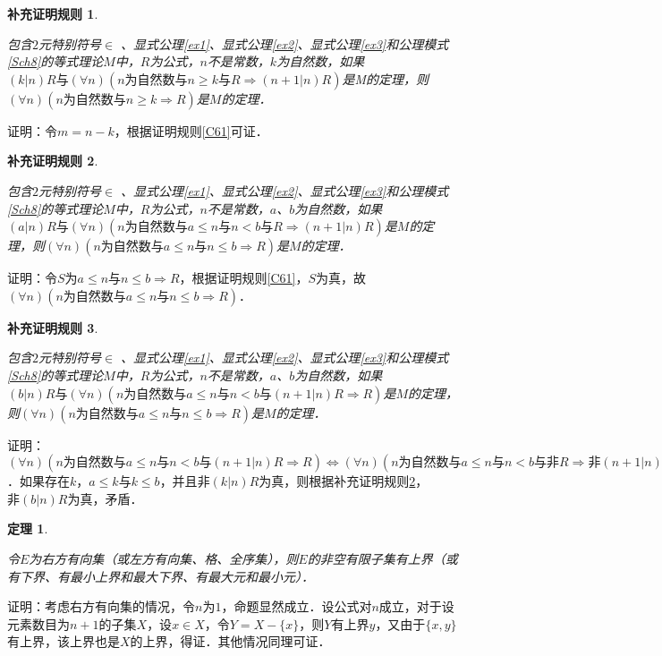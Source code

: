 \documentclass[12pt, a4paper, oneside]{book}
\newtheorem{Ccor}{补充证明规则}
\newtheorem{theo}{定理}
\begin{document}
			\begin{Ccor}\label{Ccor88}
				\hfill\par
				包含$2$元特别符号$\in$ 、显式公理\ref{ex1}、显式公理\ref{ex2}、显式公理\ref{ex3}和公理模式\ref{Sch8}的等式理论$M$中，$R$为公式，$n$不是常数，$k$为自然数，如果$(k|n)R\text{与}(\forall n)(n\text{为自然数}\text{与}n\geq k\text{与}R\Rightarrow (n+1|n)R)$是M的定理，则$(\forall n)(n\text{为自然数}\text{与}n\geq k\Rightarrow R)$是$M$的定理．
			\end{Ccor}
			证明：令$m=n-k$，根据证明规则\ref{C61}可证．
			
			\begin{Ccor}\label{Ccor89}
				\hfill\par
				包含$2$元特别符号$\in$ 、显式公理\ref{ex1}、显式公理\ref{ex2}、显式公理\ref{ex3}和公理模式\ref{Sch8}的等式理论$M$中，$R$为公式，$n$不是常数，$a$、$b$为自然数，如果$(a|n)R\text{与}(\forall n)(n\text{为自然数}\text{与}a\leq n\text{与}n<b\text{与}R \Rightarrow (n+1|n)R)$是$M$的定理，则$(\forall n)(n\text{为自然数}\text{与}a\leq n\text{与}n\leq b \Rightarrow R)$是$M$的定理．
			\end{Ccor}
			证明：令$S$为$a\leq n\text{与}n\leq b \Rightarrow R$，根据证明规则\ref{C61}，$S$为真，故$(\forall n)(n\text{为自然数}\text{与}a\leq n\text{与}n\leq b \Rightarrow R)$．
						
			\begin{Ccor}\label{Ccor90}
				\hfill\par
				包含$2$元特别符号$\in$ 、显式公理\ref{ex1}、显式公理\ref{ex2}、显式公理\ref{ex3}和公理模式\ref{Sch8}的等式理论$M$中，$R$为公式，$n$不是常数，$a$、$b$为自然数，如果$(b|n)R\text{与}(\forall n)(n\text{为自然数}\text{与}a\leq n\text{与}n<b\text{与}(n+1|n)R \Rightarrow R)$是$M$的定理，则$(\forall n)(n\text{为自然数}\text{与}a\leq n\text{与}n\leq b \Rightarrow R)$是$M$的定理．
			\end{Ccor}
			证明：$(\forall n)(n\text{为自然数}\text{与}a\leq n\text{与}n<b\text{与}(n+1|n)R \Rightarrow R)\Leftrightarrow (\forall n)(n\text{为自然数}\text{与}a\leq n\text{与}n<b\text{与}\text{非}R \Rightarrow \text{非}(n+1|n)R)$．如果存在$k$，$a\leq k\text{与}k\leq b$，并且$\text{非}(k|n)R$为真，则根据补充证明规则\ref{Ccor89}，$\text{非}(b|n)R$为真，矛盾．
						
			\begin{theo}\label{theo121}
				\hfill\par
				令$E$为右方有向集（或左方有向集、格、全序集），则$E$的非空有限子集有上界（或有下界、有最小上界和最大下界、有最大元和最小元）．
			\end{theo}
			证明：考虑右方有向集的情况，令$n$为$1$，命题显然成立．设公式对$n$成立，对于设元素数目为$n+1$的子集$X$，设$x\in X$，令$Y=X-\{x\}$，则$Y$有上界$y$，又由于$\{x, y\}$有上界，该上界也是$X$的上界，得证．其他情况同理可证．
						
\end{document}
